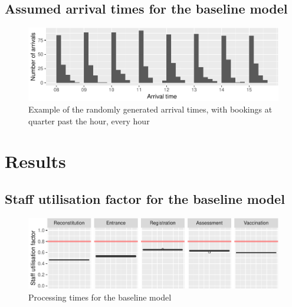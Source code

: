 \documentclass{article}
\begin{document}
\hypertarget{assumed-arrival-times-for-the-baseline-model}{%
\subsection{Assumed arrival times for the baseline
model}\label{assumed-arrival-times-for-the-baseline-model}}

\begin{figure}[h]

{\centering \includegraphics{Preprint_files/figure-latex/arrivalTimes-1} 

}

\caption{Example of the randomly generated arrival times, with bookings at quarter past the hour, every hour}\label{fig:arrivalTimes}
\end{figure}

\hypertarget{results}{%
\section{Results}\label{results}}

\hypertarget{staff-utilisation-factor-for-the-baseline-model}{%
\subsection{Staff utilisation factor for the baseline
model}\label{staff-utilisation-factor-for-the-baseline-model}}

\begin{figure}[h]

{\centering \includegraphics{Preprint_files/figure-latex/staffUtilisation-1} 

}

\caption{Processing times for the baseline model}\label{fig:staffUtilisation}
\end{figure}
\end{document}
